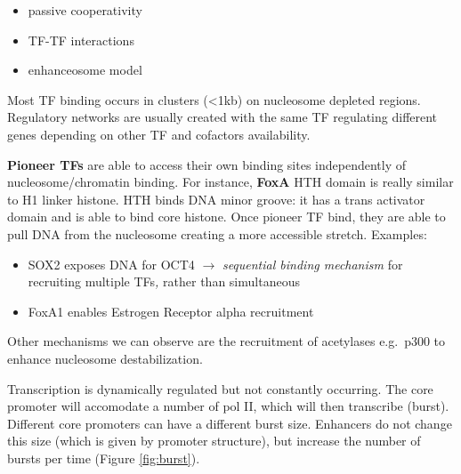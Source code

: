 \begin{itemize}
\tightlist
\item
  passive cooperativity
\item
  TF-TF interactions
\item
  enhanceosome model
\end{itemize}

Most TF binding occurs in clusters (\textless1kb) on nucleosome depleted regions. Regulatory networks are usually created with the same TF regulating different genes depending on other TF and cofactors availability.

\textbf{Pioneer TFs} are able to access their own binding sites independently of nucleosome/chromatin binding. For instance, \textbf{FoxA} HTH domain is really similar to H1 linker histone. HTH binds DNA minor groove: it has a trans activator domain and is able to bind core histone. Once pioneer TF bind, they are able to pull DNA from the nucleosome creating a more accessible stretch. Examples:

\begin{itemize}
\tightlist
\item
  SOX2 exposes DNA for OCT4 $\rightarrow$ \emph{sequential binding mechanism} for recruiting multiple TFs\emph{,} rather than simultaneous
\item
  FoxA1 enables Estrogen Receptor alpha recruitment
\end{itemize}

Other mechanisms we can observe are the recruitment of acetylases e.g.~p300 to enhance nucleosome destabilization.

Transcription is dynamically regulated but not constantly occurring. The core promoter will accomodate a number of pol II, which will then transcribe (burst). Different core promoters can have a different burst size. Enhancers do not change this size (which is given by promoter structure), but increase the number of bursts per time (Figure \ref{fig:burst}).



